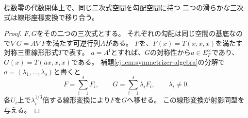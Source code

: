\begin{proposition}[滑らかな三次式の勾配空間による一意性]
\label{prop:ej-projective-uniqueness}
標数零の代数閉体上で、同じ二次式空間を勾配空間に持つ
二つの滑らかな三次式は線形座標変換で移り合う。
\end{proposition}
\begin{proof}
$F,G$をその二つの三次式とする。
それぞれの勾配は同じ空間の基底なので$\nabla G=A\nabla F$を満たす可逆行列$A$がある。
$F$を、$F(x)=T(x,x,x)$を満たす対称三重線形形式$T$で表す。
$a=A^{\mathsf t}$とすれば、$G$の対称性から$a\in E_F^\times$であり、
$G(x)=T(ax,x,x)$である。
補題\ref{ej:lem:symmetrizer-algebra}の分解で$a=(\lambda_1,\ldots,\lambda_s)$と書くと
\[
 F=\sum_{i=1}^sF_i,\qquad G=\sum_{i=1}^s\lambda_iF_i,
 \qquad\lambda_i\ne0.
\]
各$U_i$上で$\lambda_i^{1/3}$倍する線形変換により$F$を$G$へ移せる。
この線形変換が射影同型を与える。
\end{proof}
